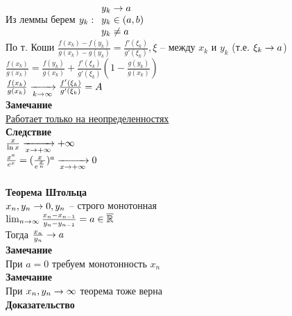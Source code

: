 \documentclass[12pt]{article}
\begin{document}
Из леммы берем $y_k: \begin{array}{l}
     y_k \rightarrow a\\
     y_k \in (a, b)\\
     y_k \neq a
\end{array}$\\
По т. Коши $\frac{f(x_k)-f(y_k)}{g(x_k)-g(y_k)} = \frac{f'(\xi_k)}{g'(\xi_k)}, \xi$ -- между $x_k$ и $y_k$ (т.е. $\xi_k \rightarrow a$)\\
$\frac{f(x_k)}{g(x_k)} = \frac{f(y_k)}{g(x_k)} + \frac{f'(\xi_k)}{g'(\xi_k)}(1-\frac{g(y_k)}{g(x_k)})$\\
$\frac{f(x_k)}{g(x_k)} \xrightarrow[k\rightarrow \infty]{} \frac{f'(\xi_k)}{g'(\xi_k)} = A$\\
\textbf{Замечание}\\
\underline{Работает только на неопределенностях}\\
\textbf{Следствие}\\
$\frac{x}{\ln x} \xrightarrow[x\rightarrow+\infty]{} +\infty$\\
$\frac{x^a}{e^x} = (\frac{x}{e^{\frac{x}{n}}})^a \xrightarrow[x\rightarrow +\infty]{} 0$\\\\
\textbf{Теорема Штольца}\\
$x_n, y_n \rightarrow 0, y_n$ -- строго монотонная\\
$\lim_{n \rightarrow \infty} \frac{x_n-x_{n-1}}{y_n-y_{n-1}} = a \in \overline{\mathbb{R}}$\\
Тогда $\frac{x_n}{y_n} \rightarrow a$\\
\textbf{Замечание}\\
При $a = 0$ требуем монотонность $x_n$\\
\textbf{Замечание}\\
При $x_n, y_n \rightarrow \infty$ теорема тоже верна\\
\textbf{Доказательство}\\
\end{document}

